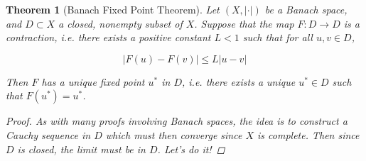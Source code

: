 \documentclass{article}
\newtheorem{theorem}{Theorem}[section]
\begin{document}

\begin{theorem}[Banach Fixed Point Theorem] Let $(X, |\cdot|)$ be a Banach space, and $D \subset X$ a closed, nonempty subset of $X$. Suppose that the map $F: D \rightarrow D$ is a contraction, i.e. there exists a positive constant $L < 1$ such that for all $u, v \in D$,

\[
|F(u) - F(v)| \leq L|u - v|
\]

Then $F$ has a unique fixed point $u^*$ in $D$, i.e. there exists a unique $u^* \in D$ such that $F(u^*) = u^*$.

\begin{proof}
As with many proofs involving Banach spaces, the idea is to construct a Cauchy sequence in $D$ which must then converge since $X$ is complete. Then since $D$ is closed, the limit must be in $D$. Let's do it!


\end{proof}
\end{theorem}
\end{document}
